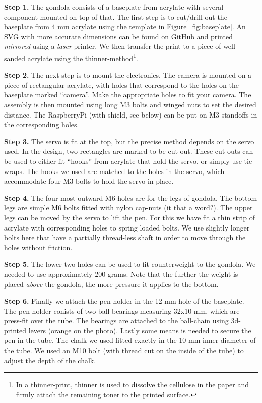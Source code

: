 \documentclass[a4paper,10pt]{article}
\begin{document}
\textbf{Step 1.} The gondola consists of a baseplate from acrylate with several component mounted on top of that. The first step is to cut/drill out the baseplate from 4 mm acrylate using the template in Figure~\ref{fig:baseplate}. An SVG with more accurate dimensions can be found on GitHub\cite{github} and printed \emph{mirrored} using a \emph{laser} printer. We then transfer the print to a piece of well-sanded acrylate using the thinner-method\footnote{In a thinner-print, thinner is used to dissolve the cellulose in the paper and firmly attach the remaining toner to the printed surface.}.

\textbf{Step 2.} The next step is to mount the electronics. The camera is mounted on a piece of rectangular acrylate, with holes that correspond to the holes on the baseplate marked ``camera''. Make the appropriate holes to fit your camera. The assembly is then mounted using long M3 bolts and winged nuts to set the desired distance. The RaspberryPi (with shield, see below) can be put on M3 standoffs in the corresponding holes.

\textbf{Step 3.} The servo is fit at the top, but the precise method depends on the servo used. In the design, two rectangles are marked to be cut out. These cut-outs can be used to either fit ``hooks'' from acrylate that hold the servo, or simply use tie-wraps. The hooks we used are matched to the holes in the servo, which accommodate four M3 bolts to hold the servo in place.

\textbf{Step 4.} The four most outward M6 holes are for the legs of gondola. The bottom legs are simple M6 bolts fitted with nylon cap-nuts (it that a word?). The upper legs can be moved by the servo to lift the pen. For this we have fit a thin strip of acrylate with corresponding holes to spring loaded bolts. We use slightly longer bolts here that have a partially thread-less shaft in order to move through the holes without friction.

\textbf{Step 5.} The lower two holes can be used to fit counterweight to the gondola. We needed to use approximately 200 grams. Note that the further the weight is placed \emph{above} the gondola, the more pressure it applies to the bottom.

\textbf{Step 6.} Finally we attach the pen holder in the 12 mm hole of the baseplate. The pen holder conists of two ball-bearings measuring 32x10 mm, which are press-fit over the tube. The bearings are attached to the ball-chain using 3d-printed levers (orange on the photo). Lastly some means is needed to secure the pen in the tube. The chalk we used fitted exactly in the 10 mm inner diameter of the tube. We used an M10 bolt (with thread cut on the inside of the tube) to adjust the depth of the chalk.
\end{document}

